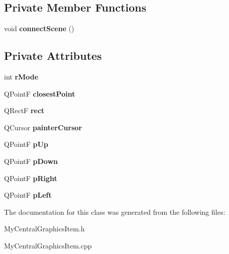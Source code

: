 \subsection*{Private Member Functions}
\begin{DoxyCompactItemize}
\item 
\hypertarget{class_my_central_graphics_item_a15879cd62e4ed70768e75f9e8f6c64d5}{}void {\bfseries connect\+Scene} ()\label{class_my_central_graphics_item_a15879cd62e4ed70768e75f9e8f6c64d5}

\end{DoxyCompactItemize}
\subsection*{Private Attributes}
\begin{DoxyCompactItemize}
\item 
\hypertarget{class_my_central_graphics_item_a1c3c6f131281480fdc3a8958eef3f2e8}{}int {\bfseries r\+Mode}\label{class_my_central_graphics_item_a1c3c6f131281480fdc3a8958eef3f2e8}

\item 
\hypertarget{class_my_central_graphics_item_afbe7a635f347c8ce75f2f194ea3a987d}{}Q\+Point\+F {\bfseries closest\+Point}\label{class_my_central_graphics_item_afbe7a635f347c8ce75f2f194ea3a987d}

\item 
\hypertarget{class_my_central_graphics_item_af93bfde444b10668aabe20622a83fe8c}{}Q\+Rect\+F {\bfseries rect}\label{class_my_central_graphics_item_af93bfde444b10668aabe20622a83fe8c}

\item 
\hypertarget{class_my_central_graphics_item_a9b7eaf6b7cd651197d685c36d973554f}{}Q\+Cursor {\bfseries painter\+Cursor}\label{class_my_central_graphics_item_a9b7eaf6b7cd651197d685c36d973554f}

\item 
\hypertarget{class_my_central_graphics_item_a9a4a2166b5975fc43679722640c55599}{}Q\+Point\+F {\bfseries p\+Up}\label{class_my_central_graphics_item_a9a4a2166b5975fc43679722640c55599}

\item 
\hypertarget{class_my_central_graphics_item_a8e98a25b3f2e6088d6a003d62a89207b}{}Q\+Point\+F {\bfseries p\+Down}\label{class_my_central_graphics_item_a8e98a25b3f2e6088d6a003d62a89207b}

\item 
\hypertarget{class_my_central_graphics_item_ae2db19506332f5717da9dd9dd5856c07}{}Q\+Point\+F {\bfseries p\+Right}\label{class_my_central_graphics_item_ae2db19506332f5717da9dd9dd5856c07}

\item 
\hypertarget{class_my_central_graphics_item_a8efbd0c513117cd1e773d91770fee899}{}Q\+Point\+F {\bfseries p\+Left}\label{class_my_central_graphics_item_a8efbd0c513117cd1e773d91770fee899}

\end{DoxyCompactItemize}


The documentation for this class was generated from the following files\+:\begin{DoxyCompactItemize}
\item 
My\+Central\+Graphics\+Item.\+h\item 
My\+Central\+Graphics\+Item.\+cpp\end{DoxyCompactItemize}

